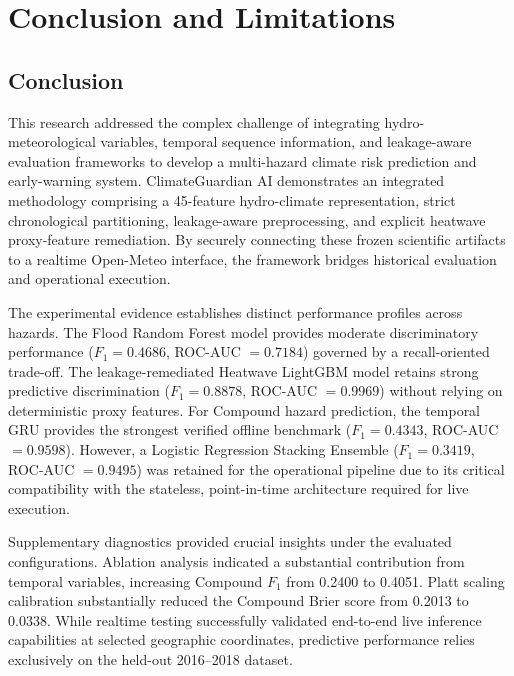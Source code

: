 \section{Conclusion and Limitations}
\label{sec:conclusion}

\subsection{Conclusion}
This research addressed the complex challenge of integrating hydro-meteorological variables, temporal sequence information, and leakage-aware evaluation frameworks to develop a multi-hazard climate risk prediction and early-warning system. ClimateGuardian AI demonstrates an integrated methodology comprising a 45-feature hydro-climate representation, strict chronological partitioning, leakage-aware preprocessing, and explicit heatwave proxy-feature remediation. By securely connecting these frozen scientific artifacts to a realtime Open-Meteo interface, the framework bridges historical evaluation and operational execution.

The experimental evidence establishes distinct performance profiles across hazards. The Flood Random Forest model provides moderate discriminatory performance ($F_1 = 0.4686$, ROC-AUC $= 0.7184$) governed by a recall-oriented trade-off. The leakage-remediated Heatwave LightGBM model retains strong predictive discrimination ($F_1 = 0.8878$, ROC-AUC $= 0.9969$) without relying on deterministic proxy features. For Compound hazard prediction, the temporal GRU provides the strongest verified offline benchmark ($F_1 = 0.4343$, ROC-AUC $= 0.9598$). However, a Logistic Regression Stacking Ensemble ($F_1 = 0.3419$, ROC-AUC $= 0.9495$) was retained for the operational pipeline due to its critical compatibility with the stateless, point-in-time architecture required for live execution.

Supplementary diagnostics provided crucial insights under the evaluated configurations. Ablation analysis indicated a substantial contribution from temporal variables, increasing Compound $F_1$ from 0.2400 to 0.4051. Platt scaling calibration substantially reduced the Compound Brier score from 0.2013 to 0.0338. While realtime testing successfully validated end-to-end live inference capabilities at selected geographic coordinates, predictive performance relies exclusively on the held-out 2016--2018 dataset.

